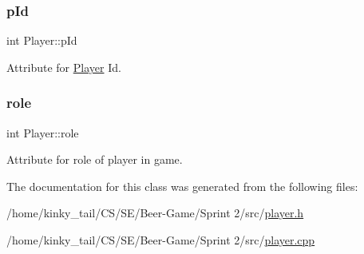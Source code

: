 \mbox{\label{class_player_aa450b5b5cdda7cae086fb28a78d1fb8c}} 
\subsubsection{\texorpdfstring{p\+Id}{pId}}
{\footnotesize\ttfamily int Player\+::p\+Id\hspace{0.3cm}{\ttfamily [private]}}



Attribute for \hyperlink{class_player}{Player} Id. 

\mbox{\label{class_player_a3544f9c49c57c160a3edae988d1fae42}} 
\subsubsection{\texorpdfstring{role}{role}}
{\footnotesize\ttfamily int Player\+::role\hspace{0.3cm}{\ttfamily [private]}}



Attribute for role of player in game. 



The documentation for this class was generated from the following files\+:\begin{DoxyCompactItemize}
\item 
/home/kinky\+\_\+tail/\+C\+S/\+S\+E/\+Beer-\/\+Game/\+Sprint 2/src/\hyperlink{player_8h}{player.\+h}\item 
/home/kinky\+\_\+tail/\+C\+S/\+S\+E/\+Beer-\/\+Game/\+Sprint 2/src/\hyperlink{player_8cpp}{player.\+cpp}\end{DoxyCompactItemize}
